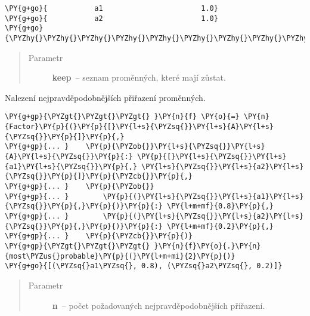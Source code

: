 \begin{fulllineitems}
\begin{fulllineitems}
\begin{Verbatim}[commandchars=\\\{\}]
\PY{g+go}{           a1                       1.0}
\PY{g+go}{           a2                       1.0}
\PY{g+go}{\PYZhy{}\PYZhy{}\PYZhy{}\PYZhy{}\PYZhy{}\PYZhy{}\PYZhy{}\PYZhy{}\PYZhy{}\PYZhy{}\PYZhy{}\PYZhy{}\PYZhy{}\PYZhy{}\PYZhy{}\PYZhy{}\PYZhy{}\PYZhy{}\PYZhy{}\PYZhy{}\PYZhy{}\PYZhy{}\PYZhy{}\PYZhy{}\PYZhy{}\PYZhy{}\PYZhy{}\PYZhy{}\PYZhy{}\PYZhy{}\PYZhy{}\PYZhy{}\PYZhy{}\PYZhy{}\PYZhy{}\PYZhy{}\PYZhy{}\PYZhy{}\PYZhy{}\PYZhy{}\PYZhy{}\PYZhy{}\PYZhy{}\PYZhy{}\PYZhy{}\PYZhy{}\PYZhy{}\PYZhy{}\PYZhy{}\PYZhy{}}
\end{Verbatim}
\begin{quote}\begin{description}
\item[{Parametr}] \leavevmode
\textbf{keep}~-- seznam proměnných, které mají zůstat.

\end{description}\end{quote}

\end{fulllineitems}


\begin{fulllineitems}
\label{alex.infer:alex.infer.factor.Factor.most_probable}
Nalezení nejpravděpodobnějších přiřazení proměnných.

\begin{Verbatim}[commandchars=\\\{\}]
\PY{g+gp}{\PYZgt{}\PYZgt{}\PYZgt{} }\PY{n}{f} \PY{o}{=} \PY{n}{Factor}\PY{p}{(}\PY{p}{[}\PY{l+s}{\PYZsq{}}\PY{l+s}{A}\PY{l+s}{\PYZsq{}}\PY{p}{]}\PY{p}{,}
\PY{g+gp}{... }    \PY{p}{\PYZob{}}\PY{l+s}{\PYZsq{}}\PY{l+s}{A}\PY{l+s}{\PYZsq{}}\PY{p}{:} \PY{p}{[}\PY{l+s}{\PYZsq{}}\PY{l+s}{a1}\PY{l+s}{\PYZsq{}}\PY{p}{,} \PY{l+s}{\PYZsq{}}\PY{l+s}{a2}\PY{l+s}{\PYZsq{}}\PY{p}{]}\PY{p}{\PYZcb{}}\PY{p}{,}
\PY{g+gp}{... }    \PY{p}{\PYZob{}}
\PY{g+gp}{... }        \PY{p}{(}\PY{l+s}{\PYZsq{}}\PY{l+s}{a1}\PY{l+s}{\PYZsq{}}\PY{p}{,}\PY{p}{)}\PY{p}{:} \PY{l+m+mf}{0.8}\PY{p}{,}
\PY{g+gp}{... }        \PY{p}{(}\PY{l+s}{\PYZsq{}}\PY{l+s}{a2}\PY{l+s}{\PYZsq{}}\PY{p}{,}\PY{p}{)}\PY{p}{:} \PY{l+m+mf}{0.2}\PY{p}{,}
\PY{g+gp}{... }    \PY{p}{\PYZcb{}}\PY{p}{)}
\PY{g+gp}{\PYZgt{}\PYZgt{}\PYZgt{} }\PY{n}{f}\PY{o}{.}\PY{n}{most\PYZus{}probable}\PY{p}{(}\PY{l+m+mi}{2}\PY{p}{)}
\PY{g+go}{[(\PYZsq{}a1\PYZsq{}, 0.8), (\PYZsq{}a2\PYZsq{}, 0.2)]}
\end{Verbatim}
\begin{quote}\begin{description}
\item[{Parametr}] \leavevmode
\textbf{n}~-- počet požadovaných nejpravděpodobnějších přiřazení.


\end{description}
\end{quote}
\end{fulllineitems}
\end{fulllineitems}
